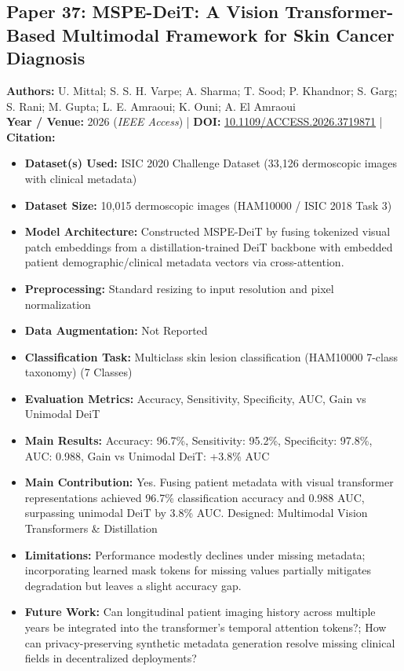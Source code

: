 \documentclass[11pt,a4paper]{article}
\begin{document}
\subsection{Paper 37: MSPE-DeiT: A Vision Transformer-Based Multimodal Framework for Skin Cancer Diagnosis}
\textbf{Authors:} U. Mittal; S. S. H. Varpe; A. Sharma; T. Sood; P. Khandnor; S. Garg; S. Rani; M. Gupta; L. E. Amraoui; K. Ouni; A. El Amraoui \\
\textbf{Year / Venue:} 2026 (\textit{IEEE Access}) | \textbf{DOI:} \href{https://doi.org/10.1109/ACCESS.2026.3719871}{10.1109/ACCESS.2026.3719871} | \textbf{Citation:} \cite{11641552}

\begin{itemize}\small
\item \textbf{Dataset(s) Used:} ISIC 2020 Challenge Dataset (33,126 dermoscopic images with clinical metadata)
\item \textbf{Dataset Size:} 10,015 dermoscopic images (HAM10000 / ISIC 2018 Task 3)
\item \textbf{Model Architecture:} Constructed MSPE-DeiT by fusing tokenized visual patch embeddings from a distillation-trained DeiT backbone with embedded patient demographic/clinical metadata vectors via cross-attention.
\item \textbf{Preprocessing:} Standard resizing to input resolution and pixel normalization
\item \textbf{Data Augmentation:} Not Reported
\item \textbf{Classification Task:} Multiclass skin lesion classification (HAM10000 7-class taxonomy) (7 Classes)
\item \textbf{Evaluation Metrics:} Accuracy, Sensitivity, Specificity, AUC, Gain vs Unimodal DeiT
\item \textbf{Main Results:} Accuracy: 96.7\%, Sensitivity: 95.2\%, Specificity: 97.8\%, AUC: 0.988, Gain vs Unimodal DeiT: +3.8\% AUC
\item \textbf{Main Contribution:} Yes. Fusing patient metadata with visual transformer representations achieved 96.7\% classification accuracy and 0.988 AUC, surpassing unimodal DeiT by 3.8\% AUC. Designed: Multimodal Vision Transformers \& Distillation
\item \textbf{Limitations:} Performance modestly declines under missing metadata; incorporating learned mask tokens for missing values partially mitigates degradation but leaves a slight accuracy gap.
\item \textbf{Future Work:} Can longitudinal patient imaging history across multiple years be integrated into the transformer's temporal attention tokens?; How can privacy-preserving synthetic metadata generation resolve missing clinical fields in decentralized deployments?

\end{itemize}
\end{document}
